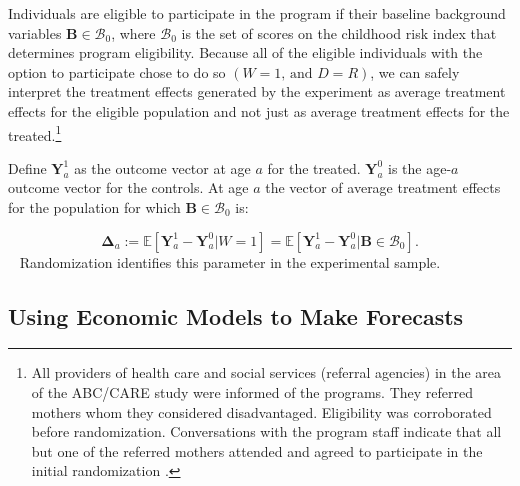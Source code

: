 Individuals are eligible to participate in the program if their baseline background variables $\bm{B}\in\mathcal{B}_0$, where $\mathcal{B}_0$ is the set of scores on the childhood risk index that determines program eligibility. Because all of the eligible individuals with the option to participate chose to do so $(W=1\text{, and } D=R)$, we can safely interpret the treatment effects generated by the experiment as average treatment effects for the eligible population and not just as average treatment effects for the treated.\footnote{All providers of health care and social services (referral agencies) in the area of the ABC/CARE study were informed of the programs. They referred mothers whom they considered disadvantaged. Eligibility was corroborated before randomization. Conversations with the program staff indicate that all but one of the referred mothers attended and agreed to participate in the initial randomization \citep{Ramey-etal_2012-ABC}.}

Define $\bm{Y}^1_a$ as the outcome vector at age $a$ for the treated. $\bm{Y}^0_a$ is the age-$a$ outcome vector for the controls. At age $a$ the vector of average treatment effects for the population for which $\bm{B}\in\mathcal{B}_0$ is:

\begin{equation}
\bm{\Delta}_a  := \mathbb{E} \left[ \bm{Y}^1_a - \bm{Y}^0_a | W = 1 \right] = \mathbb{E} \left[\bm{Y}^1_a - \bm{Y}^0_{a} | \bm{B} \in \mathcal{B}_0 \right]. \label{eq:mainte}
\end{equation}\
%
Randomization identifies this parameter in the experimental sample.

\subsection{Using Economic Models to Make Forecasts}

